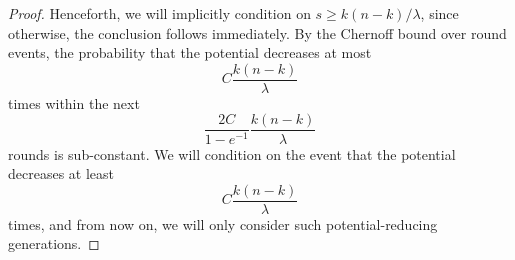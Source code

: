 \begin{proof}
    Henceforth, we will implicitly condition on $ s \geq k(n-k) /\lambda $, since otherwise, the conclusion follows immediately. By the Chernoff bound over round events, the probability that the potential decreases at most 
    \begin{displaymath}
    C \frac{k(n-k)}{\lambda}
    \end{displaymath}
    times within the next 
    \begin{displaymath}
    \frac{2C}{1-e^{-1}} \frac{k(n-k)}{\lambda} 
    \end{displaymath}
    rounds is sub-constant. We will condition on the event that the potential decreases at least 
    \begin{displaymath}
    C \frac{k(n-k)}{\lambda}
    \end{displaymath}
    times, and from now on, we will only consider such potential-reducing generations.


\end{proof}
